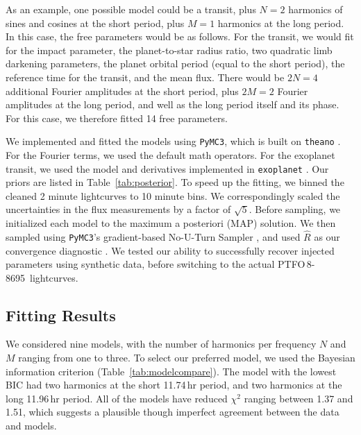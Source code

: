 \documentclass[12pt,twocolumn,tighten]{aastex62}
\newcommand{\ptfo}{PTFO$\,$8-8695}
\begin{document}
As an example, one possible model could be a transit, plus $N=2$
harmonics of sines and cosines at the short period, plus $M=1$
harmonics at the long period.  In this case, the free parameters would
be as follows.  For the transit, we would fit for the impact
parameter, the planet-to-star radius ratio, two quadratic limb
darkening parameters, the planet orbital period (equal to the short
period), the reference time for the transit, and the mean flux.  There
would be $2N=4$ additional Fourier amplitudes at the short period,
plus $2M=2$ Fourier amplitudes at the long period, and well as the
long period itself and its phase.  For this case, we therefore fitted
14 free parameters.

We implemented and fitted the models using \texttt{PyMC3}, which is
built on \texttt{theano}
\citep{salvatier_2016_PyMC3,exoplanet:theano}.  For the Fourier terms,
we used the default math operators.  For the exoplanet transit, we
used the model and derivatives implemented in \texttt{exoplanet}
\citep{exoplanet:exoplanet}.  Our priors are listed in
Table~\ref{tab:posterior}.  To speed up the fitting, we binned the
cleaned 2 minute lightcurves to 10 minute bins.  We correspondingly
scaled the uncertainties in the flux measurements by a factor of
$\sqrt{5}$.  Before sampling, we initialized each model to the maximum
a posteriori (MAP) solution.  We then sampled using \texttt{PyMC3}'s
gradient-based No-U-Turn Sampler \citep{hoffman_no-u-turn_2014}, and
used $\hat{R}$ as our convergence diagnostic
\citep{gelman_inference_1992}.
We tested our ability to successfully recover injected parameters
using synthetic data, before switching to the actual \ptfo\
lightcurves.


\subsection{Fitting Results}


%

We considered nine models, with the number of harmonics per frequency
$N$ and $M$ ranging from one to three.  To select our preferred model,
we used the Bayesian information criterion
(Table~\ref{tab:modelcompare}).  The model with the lowest BIC had
two harmonics at the short 11.74$\,$hr period, and two harmonics
at the long 11.96$\,$hr period.  All of the models have reduced
$\chi^2$ ranging between 1.37 and 1.51, which suggests a plausible
though imperfect agreement between the data and models.
\end{document}
